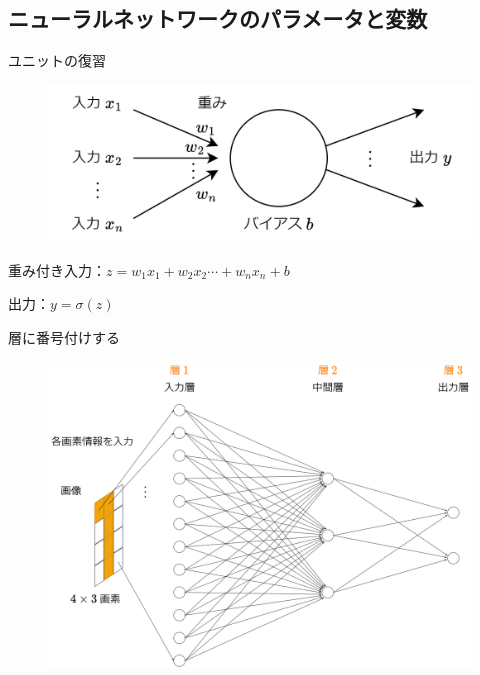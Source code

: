 \documentclass[dvipdfmx,aspectratio=169]{beamer}
\begin{document}
	\subsection{ニューラルネットワークのパラメータと変数}
	\begin{frame}{ユニットの復習}
		\begin{figure}
			\centering
			\includegraphics[width=0.8\linewidth]{img/summary-of-unit}
		\end{figure}
		重み付き入力：$ z = w_1x_1 + w_2x_2 \cdots + w_nx_n + b $
		
		出力：$ y = \sigma(z) $
	\end{frame}
	\begin{frame}{層に番号付けする}
		\begin{figure}
			\centering
			\includegraphics[width=0.7\linewidth]{img/name-of-the-layers-of-a-hierarchical-neural-network}
		\end{figure}
	\end{frame}
\end{document}
